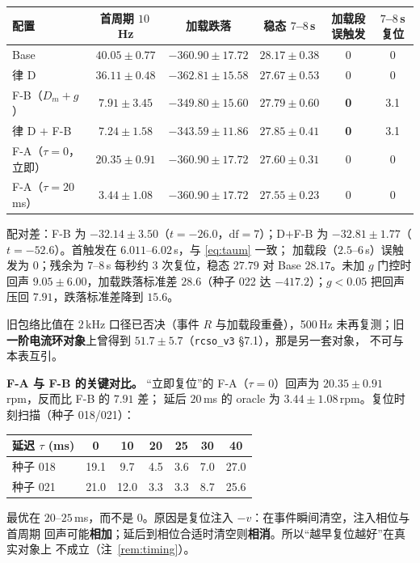 \documentclass[11pt,a4paper]{article}
\theoremstyle{remark}
\begin{document}
\begin{center}\footnotesize
\begin{tabular}{@{}lccccc@{}}
\toprule
配置 & 首周期 $10$\,Hz & 加载跌落 & 稳态 $7$--$8$\,s & 加载段误触发 & $7$--$8$\,s 复位\\
\midrule
Base & $40.05\pm0.77$ & $-360.90\pm17.72$ & $28.17\pm0.38$ & 0 & 0\\
律 D & $36.11\pm0.48$ & $-362.81\pm15.58$ & $27.67\pm0.53$ & 0 & 0\\
F-B（$D_m+g$） & $\mathbf{7.91\pm3.45}$ & $-349.80\pm15.60$ & $27.79\pm0.60$ & \textbf{0} & 3.1\\
律 D $+$ F-B & $\mathbf{7.24\pm1.58}$ & $-343.59\pm11.86$ & $27.85\pm0.41$ & \textbf{0} & 3.1\\
F-A（$\tau=0$，立即） & $20.35\pm0.91$ & $-360.90\pm17.72$ & $27.60\pm0.31$ & 0 & 0\\
F-A（$\tau=20$\,ms） & $\mathbf{3.44\pm1.08}$ & $-360.90\pm17.72$ & $27.55\pm0.23$ & 0 & 0\\
\bottomrule
\end{tabular}
\end{center}

配对差：F-B 为 $-32.14\pm3.50$（$t=-26.0$，$\mathrm{df}=7$）；D$+$F-B 为
$-32.81\pm1.77$（$t=-52.6$）。首触发在 $6.011$--$6.02$\,s，与 \eqref{eq:taum} 一致；
加载段（$2.5$--$6$\,s）误触发为 0；残余为 $7$--$8$\,s 每秒约 $3$ 次复位，稳态 $27.79$ 对 Base $28.17$。未加 $g$ 门控时回声 $9.05\pm6.00$，加载跌落标准差 $28.6$（种子 022 达
$-417.2$）；$g<0.05$ 把回声压回 $7.91$，跌落标准差降到 $15.6$。

旧包络比值在 $2$\,kHz 口径已否决（事件 $R$ 与加载段重叠），500\,Hz 未再复测；旧
\textbf{一阶电流环对象}上曾得到 $51.7\pm5.7$（\texttt{rcso\_v3} \S7.1），那是另一套对象，
不可与本表互引。

\noindent\textbf{F-A 与 F-B 的关键对比。}
“立即复位”的 F-A（$\tau=0$）回声为 $20.35\pm0.91$\,rpm，反而比 F-B 的 $7.91$ 差；
延后 $20$\,ms 的 oracle 为 $3.44\pm1.08$\,rpm。复位时刻扫描（种子 018/021）：
\begin{center}\footnotesize
\begin{tabular}{@{}lcccccc@{}}
\toprule
延迟 $\tau$ (ms) & 0 & 10 & 20 & 25 & 30 & 40\\
\midrule
种子 018 & 19.1 & 9.7 & 4.5 & 3.6 & 7.0 & 27.0\\
种子 021 & 21.0 & 12.0 & 3.3 & 3.3 & 8.7 & 25.6\\
\bottomrule
\end{tabular}
\end{center}
最优在 $20$--$25$\,ms，而不是 $0$。原因是复位注入 $-v$：在事件瞬间清空，注入相位与首周期
回声可能\textbf{相加}；延后到相位合适时清空则\textbf{相消}。所以“越早复位越好”在真实对象上
不成立（注~\ref{rem:timing}）。
\end{document}
